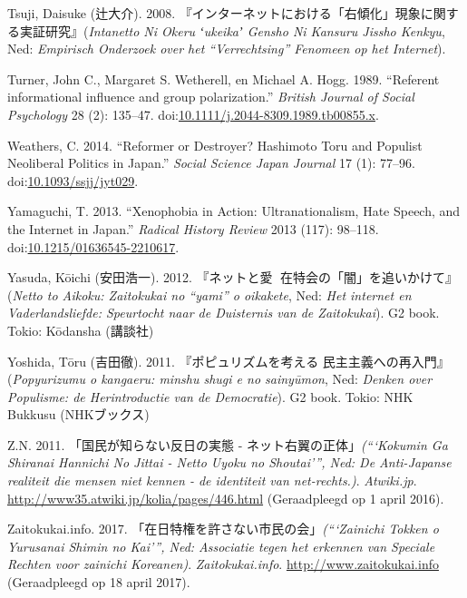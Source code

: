 \documentclass[10.5pt,dutch,]{article}
\begin{document}
\hypertarget{ref-tsujiux5fintanettoux5f2008}{}
Tsuji, Daisuke (辻大介). 2008. 『インターネットにおける「右傾化」現象に関する実証研究』(\emph{Intanetto Ni Okeru ʻukeikaʼ Gensho Ni Kansuru Jissho Kenkyu}, Ned: \emph{Empirisch Onderzoek over het “Verrechtsing” Fenomeen op het Internet}).

\hypertarget{ref-turnerux5freferentux5f1989}{}
Turner, John C., Margaret S. Wetherell, en Michael A. Hogg. 1989.
“Referent informational influence and group polarization.” \emph{British
Journal of Social Psychology} 28 (2): 135--47.
doi:\href{https://doi.org/10.1111/j.2044-8309.1989.tb00855.x}{10.1111/j.2044-8309.1989.tb00855.x}.

\hypertarget{ref-weathersux5freformerux5f2014}{}
Weathers, C. 2014. “Reformer or Destroyer? Hashimoto Toru and Populist
Neoliberal Politics in Japan.” \emph{Social Science Japan Journal} 17
(1): 77--96.
doi:\href{https://doi.org/10.1093/ssjj/jyt029}{10.1093/ssjj/jyt029}.

\hypertarget{ref-yamaguchiux5fxenophobiaux5f2013}{}
Yamaguchi, T. 2013. “Xenophobia in Action: Ultranationalism, Hate Speech,
and the Internet in Japan.” \emph{Radical History Review} 2013 (117):
98--118.
doi:\href{https://doi.org/10.1215/01636545-2210617}{10.1215/01636545-2210617}.

\hypertarget{ref-yasudaux5fnettoux5f2012}{}
Yasuda, Kōichi (安田浩一). 2012. 『ネットと愛国̶ 在特会の「闇」を追いかけて』(\emph{Netto to Aikoku: Zaitokukai
no “yami” o oikakete}, Ned: \emph{Het internet en Vaderlandsliefde: Speurtocht naar de Duisternis van de
Zaitokukai}). G2 book. Tokio: Kōdansha (講談社)

\hypertarget{ref-yoshidaux5fpopyurizumuux5f2011}{}
Yoshida, Tōru (吉田徹). 2011. 『ポピュリズムを考える 民主主義への再入門』(\emph{Popyurizumu o kangaeru: minshu shugi e no sainyūmon}, Ned: \emph{Denken over Populisme: de Herintroductie van de Democratie}). G2 book. Tokio: NHK Bukkusu (NHKブックス)

\hypertarget{ref-z.n.ux5fkokuminux5f2011}{}
Z.N. 2011. 「国民が知らない反日の実態 - ネット右翼の正体」\emph{(“‘Kokumin Ga Shiranai Hannichi No Jittai - Netto Uyoku no Shoutai’”, Ned:  De Anti-Japanse realiteit die mensen niet kennen - de identiteit van net-rechts.)}. \emph{Atwiki.jp}. \url{http://www35.atwiki.jp/kolia/pages/446.html} (Geraadpleegd op 1 april 2016).

\hypertarget{ref-zaitokukai.infoux5fzaitokukaiux5f2017}{}
Zaitokukai.info. 2017. 「在日特権を許さない市民の会」\emph{(“‘Zainichi Tokken o Yurusanai Shimin no Kai’”, Ned:  Associatie tegen het erkennen van Speciale Rechten voor zainichi Koreanen)}. \emph{Zaitokukai.info}. \url{http://www.zaitokukai.info} (Geraadpleegd op 18 april 2017).
\end{document}
